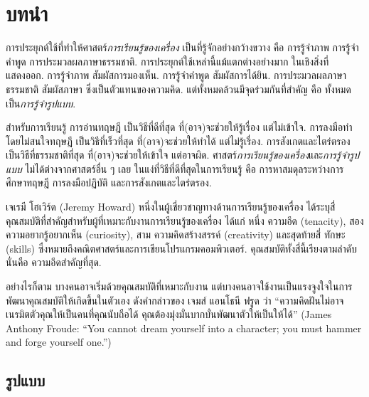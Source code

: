 \chapter{บทนำ}
\label{chapter: introduction}

การประยุกต์ใช้ที่ทำให้ศาสตร์\textit{การเรียนรู้ของเครื่อง}
เป็นที่รู้จักอย่างกว้างขวาง คือ การรู้จำภาพ การรู้จำคำพูด การประมวลผลภาษาธรรมชาติ.
การประยุกต์ใช้เหล่านี้แม้แตกต่างอย่างมาก ในเชิงสิ่งที่แสดงออก.
การรู้จำภาพ สัมผัสการมองเห็น. 
การรู้จำคำพูด สัมผัสการได้ยิน.
การประมวลผลภาษาธรรมชาติ สัมผัสภาษา ซึ่งเป็นตัวแทนของความคิด.
แต่ทั้งหมดล้วนมีจุดร่วมกันที่สำคัญ
คือ ทั้งหมดเป็น\textit{การรู้จำรูปแบบ}.

สำหรับการเรียนรู้
การอ่านทฤษฎี เป็นวิธีที่ดีที่สุด ที่(อาจ)จะช่วยให้รู้เรื่อง แต่ไม่เข้าใจ.
การลงมือทำโดยไม่สนใจทฤษฎี เป็นวิธีที่เร็วที่สุด ที่(อาจ)จะช่วยให้ทำได้ แต่ไม่รู้เรื่อง.
การสังเกตและไตร่ตรอง เป็นวิธีที่ธรรมชาติที่สุด ที่(อาจ)จะช่วยให้เข้าใจ แต่อาจผิด.
ศาสตร์\textit{การเรียนรู้ของเครื่อง}และ\textit{การรู้จำรูปแบบ}
ไม่ได้ต่างจากศาสตร์อื่น ๆ เลย ในแง่ที่วิธีที่ดีที่สุดในการเรียนรู้ 
คือ การหาสมดุลระหว่างการศึกษาทฤษฎี การลงมือปฏิบัติ และการสังเกตและไตร่ตรอง.

เจเรมี โฮเวิร์ด (Jeremy Howard) หนึ่งในผู้เชี่ยวชาญทางด้านการเรียนรู้ของเครื่อง ได้ระบุสี่คุณสมบัติที่สำคัญสำหรับผู้ที่เหมาะกับงานการเรียนรู้ของเครื่อง ได้แก่
หนึ่ง ความอึด (tenacity), 
สอง ความอยากรู้อยากเห็น (curiosity),
สาม ความคิดสร้างสรรค์ (creativity) และสุดท้ายสี่ ทักษะ (skills) ซึ่งหมายถึงคณิตศาสตร์และการเขียนโปรแกรมคอมพิวเตอร์.
คุณสมบัติทั้งสี่นี้เรียงตามลำดับ
นั่นคือ ความอึดสำคัญที่สุด.

อย่างไรก็ตาม บางคนอาจเริ่มด้วยคุณสมบัติที่เหมาะกับงาน 
แต่บางคนอาจใช้งานเป็นแรงจูงใจในการพัฒนาคุณสมบัติให้เกิดขึ้นในตัวเอง
ดังคำกล่าวของ {เจมส์} {แอนโธนี} {ฟรูด} ว่า ``ความคิดฝันไม่อาจเนรมิตตัวคุณให้เป็นคนที่คุณนับถือได้ คุณต้องมุ่งมั่นบากบั่นพัฒนาตัวให้เป็นให้ได้''
(James Anthony Froude: ``You cannot dream yourself into a character; you must hammer and forge yourself one.'')

\section{รูปแบบ}

